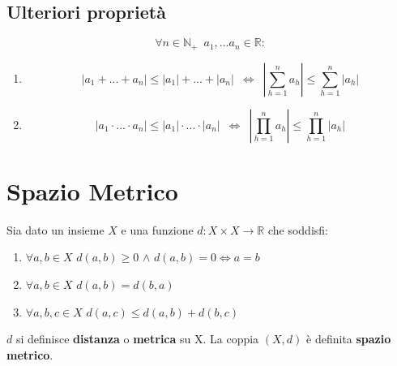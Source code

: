 \documentclass[10pt, oneside]{book}
\theoremstyle{plain}
\begin{document}
\subsection*{Ulteriori proprietà}
\begin{prop}
    \[\forall n \in \mathbb{N}_+ \enspace a_1, ... a_n \in \mathbb{R} :\]
    \begin{enumerate}
        \item 
        \[|a_1 + ... + a_n| \leq |a_1| + ... + |a_n| \enspace \Leftrightarrow \enspace |\sum \limits_{h=1}^n a_h| \leq \sum \limits_{h=1}^n |a_h|\]
        \item
        \[|a_1 \cdot ... \cdot a_n| \leq |a_1| \cdot ... \cdot |a_n| \enspace \Leftrightarrow \enspace |\prod \limits_{h=1}^n a_h| \leq \prod \limits_{h=1}^n |a_h|\]
    \end{enumerate}
\end{prop}

\section{Spazio Metrico}
\begin{defin}
    Sia dato un insieme $X$ e una funzione $d : X \times X \rightarrow \mathbb{R}$ che soddisfi:
    \begin{enumerate}
        \item $\forall a,b \in X$ $d(a,b) \geq 0$ $\land$ $d(a,b) = 0 \Leftrightarrow a = b$
        \item $\forall a,b \in X$ $d(a,b) = d(b,a)$
        \item$\forall a,b,c \in X$ $d(a,c) \leq d(a,b) + d(b,c)$
    \end{enumerate}
    $d$ si definisce \textbf{distanza} o \textbf{metrica} su X. La coppia $(X,d)$ è definita \textbf{spazio metrico}.
\end{defin}
\end{document}
